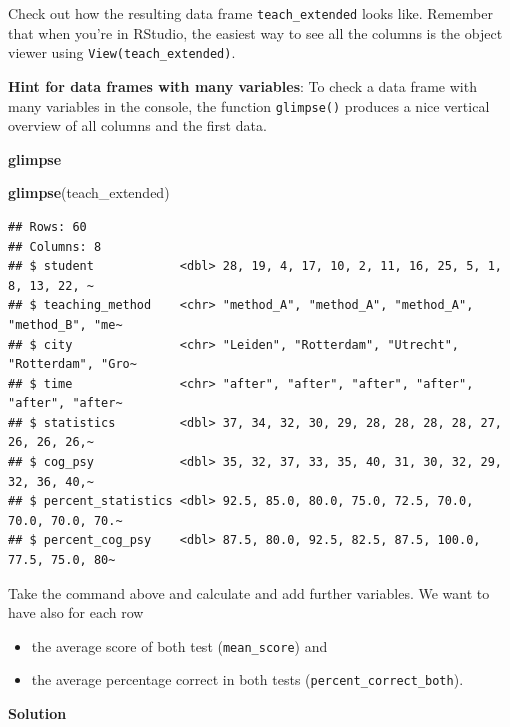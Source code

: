 \documentclass[
]{scrartcl}
\makeatletter
\newenvironment{Shaded}{\begin{snugshade}}{\end{snugshade}}
\newcommand{\FunctionTok}[1]{\textcolor[rgb]{0.13,0.29,0.53}{\textbf{#1}}}
\newcommand{\NormalTok}[1]{#1}
\providecommand{\tightlist}{%
  \setlength{\itemsep}{0pt}\setlength{\parskip}{0pt}}
\newenvironment{kframe}{%
\medskip{}
\setlength{\fboxsep}{.8em}
 \def\at@end@of@kframe{}%
 \ifinner\ifhmode%
  \def\at@end@of@kframe{\end{minipage}}%
  \begin{minipage}{\columnwidth}%
 \fi\fi%
 \def\FrameCommand##1{\hskip\@totalleftmargin \hskip-\fboxsep
 \colorbox{shadecolor}{##1}\hskip-\fboxsep
     \hskip-\linewidth \hskip-\@totalleftmargin \hskip\columnwidth}%
 \MakeFramed {\advance\hsize-\width
   \@totalleftmargin\z@ \linewidth\hsize
   \@setminipage}}%
 {\par\unskip\endMakeFramed%
 \at@end@of@kframe}
\newenvironment{rmdblock}[1]
  {
  \begin{itemize}
  \renewcommand{\labelitemi}{
    \raisebox{-.7\height}[0pt][0pt]{
      {\setkeys{Gin}{width=3em,keepaspectratio}\texttt{[image: images/\#1]}}
    }
  }
  \setlength{\fboxsep}{1em}
  \begin{kframe}
  \item
  }
  {
  \end{kframe}
  \end{itemize}
  }
\newenvironment{myexercise}
    {\begin{rmdblock}{exercise_green}}
    {\end{rmdblock}}
\newenvironment{webexsolution}[1]
    {\par\tiny\textbf{#1}}
    {\par}
\newcommand{\webexhide}[1]{\begin{webexsolution}{#1}}
\newcommand{\webexunhide}{\end{webexsolution}}
\makeatother
\begin{document}
Check out how the resulting data frame \texttt{teach\_extended} looks like. Remember that when you're in RStudio, the easiest way to see all the columns is the object viewer using \texttt{View(teach\_extended)}.

\textbf{Hint for data frames with many variables}: To check a data frame with many variables in the console, the function \texttt{glimpse()} produces a nice vertical overview of all columns and the first data.

\webexhide{glimpse}

\begin{Shaded}
\begin{Highlighting}[]
\FunctionTok{glimpse}\NormalTok{(teach\_extended)}
\end{Highlighting}
\end{Shaded}

\begin{verbatim}
## Rows: 60
## Columns: 8
## $ student            <dbl> 28, 19, 4, 17, 10, 2, 11, 16, 25, 5, 1, 8, 13, 22, ~
## $ teaching_method    <chr> "method_A", "method_A", "method_A", "method_B", "me~
## $ city               <chr> "Leiden", "Rotterdam", "Utrecht", "Rotterdam", "Gro~
## $ time               <chr> "after", "after", "after", "after", "after", "after~
## $ statistics         <dbl> 37, 34, 32, 30, 29, 28, 28, 28, 28, 27, 26, 26, 26,~
## $ cog_psy            <dbl> 35, 32, 37, 33, 35, 40, 31, 30, 32, 29, 32, 36, 40,~
## $ percent_statistics <dbl> 92.5, 85.0, 80.0, 75.0, 72.5, 70.0, 70.0, 70.0, 70.~
## $ percent_cog_psy    <dbl> 87.5, 80.0, 92.5, 82.5, 87.5, 100.0, 77.5, 75.0, 80~
\end{verbatim}

\webexunhide

\begin{myexercise}
 Take the command above and calculate and add further variables. We want
 to have also for each row
 
 \begin{itemize}
 \tightlist
 \item
   the average score of both test (\texttt{mean\_score}) and
 \item
   the average percentage correct in both tests
   (\texttt{percent\_correct\_both}).
 \end{itemize}
 \end{myexercise}
\webexhide{Solution}
\end{document}
